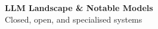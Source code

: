 





\begin{frame}[fragile]\frametitle{}
\begin{center}
{\Large \textbf{LLM Landscape \& Notable Models}}\\[0.5em]
{\normalsize Closed, open, and specialised systems}
\end{center}
\end{frame}

